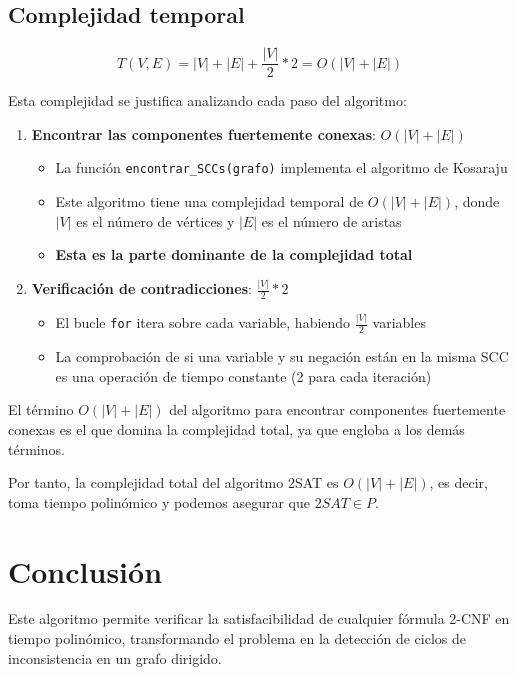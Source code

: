 \documentclass[a4paper,12pt]{article}
\begin{document}
\subsection*{Complejidad temporal}

\begin{equation*}
	T(V, E) = |V| + |E| + \frac{|V|}{2} * 2 = O(|V| + |E|)
\end{equation*}

Esta complejidad se justifica analizando cada paso del algoritmo:

\begin{enumerate}
    \item \textbf{Encontrar las componentes fuertemente conexas}: $O(|V| + |E|)$
    \begin{itemize}
        \item La función \texttt{encontrar\_SCCs(grafo)} implementa el algoritmo de Kosaraju
        \item Este algoritmo tiene una complejidad temporal de $O(|V| + |E|)$, donde $|V|$ es el número de vértices y $|E|$ es el número de aristas
        \item \textbf{Esta es la parte dominante de la complejidad total}
    \end{itemize}
    
    \item \textbf{Verificación de contradicciones}: $\frac{|V|}{2} * 2$
    \begin{itemize}
        \item El bucle \texttt{for} itera sobre cada variable, habiendo $\frac{|V|}{2}$ variables
        \item La comprobación de si una variable y su negación están en la misma SCC es una operación de tiempo constante (2 para cada iteración)
    \end{itemize}
\end{enumerate}

El término $O(|V| + |E|)$ del algoritmo para encontrar componentes fuertemente conexas es el que domina la complejidad total, ya que engloba a los demás términos.

Por tanto, la complejidad total del algoritmo 2SAT es $O(|V| + |E|)$, es decir, toma tiempo polinómico y podemos asegurar que $2SAT \in P$.

\section{Conclusión}

Este algoritmo permite verificar la satisfacibilidad de cualquier fórmula 2-CNF en tiempo polinómico, transformando el problema en la detección de ciclos de inconsistencia en un grafo dirigido.
\end{document}
